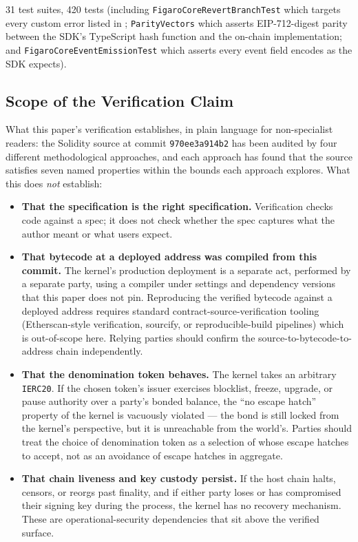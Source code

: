 \documentclass[11pt,a4paper]{article}
\theoremstyle{definition}
\theoremstyle{remark}
\begin{document}
31 test suites, 420 tests (including
\texttt{FigaroCoreRevertBranchTest} which targets every custom error
listed in ; \texttt{ParityVectors} which
asserts EIP-712-digest parity between the SDK's TypeScript hash
function and the on-chain implementation; and
\texttt{FigaroCoreEventEmissionTest} which asserts every event field
encodes as the SDK expects).

\subsection{Scope of the Verification Claim}
\label{sec:verification-scope}

What this paper's verification establishes, in plain language for
non-specialist readers: the Solidity source at commit
\texttt{970ee3a914b2} has been audited by four different
methodological approaches, and each approach has found that the
source satisfies seven named properties within the bounds each
approach explores. What this does \emph{not} establish:

\begin{itemize}
  \item \textbf{That the specification is the right specification.}
    Verification checks code against a spec; it does not check
    whether the spec captures what the author meant or what users
    expect.
  \item \textbf{That bytecode at a deployed address was compiled
    from this commit.} The kernel's production deployment is a
    separate act, performed by a separate party, using a compiler
    under settings and dependency versions that this paper does
    not pin. Reproducing the verified bytecode against a deployed
    address requires standard contract-source-verification
    tooling (Etherscan-style verification, sourcify, or
    reproducible-build pipelines) which is out-of-scope here.
    Relying parties should confirm the source-to-bytecode-to-address
    chain independently.
  \item \textbf{That the denomination token behaves.} The kernel
    takes an arbitrary \texttt{IERC20}. If the chosen token's
    issuer exercises blocklist, freeze, upgrade, or pause
    authority over a party's bonded balance, the ``no escape
    hatch'' property of the kernel is vacuously violated --- the
    bond is still locked from the kernel's perspective, but it
    is unreachable from the world's. Parties should treat the
    choice of denomination token as a selection of whose escape
    hatches to accept, not as an avoidance of escape hatches in
    aggregate.
  \item \textbf{That chain liveness and key custody persist.} If
    the host chain halts, censors, or reorgs past finality, and
    if either party loses or has compromised their signing key
    during the process, the kernel has no recovery mechanism.
    These are operational-security dependencies that sit above
    the verified surface.
\end{itemize}
\end{document}
